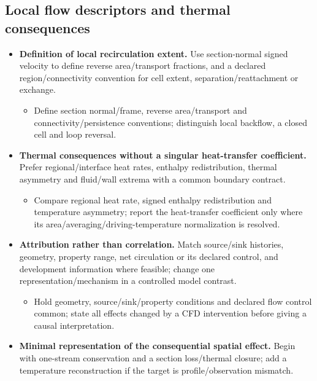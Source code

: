 \subsection{Local flow descriptors and thermal consequences}\label{subsec:local-flow-descriptors-and-thermal-consequences}
\begin{itemize}[leftmargin=*]

\item {}\textbf{Definition of local recirculation extent.} Use section-normal signed velocity to define reverse area/\allowbreak{}transport fractions, and a declared region/\allowbreak{}connectivity convention for cell extent, separation/\allowbreak{}reattachment or exchange.
\begin{itemize}
\item Define section normal/\allowbreak{}frame, reverse area/\allowbreak{}transport and connectivity/\allowbreak{}persistence conventions; distinguish local backflow, a closed cell and loop reversal.
\end{itemize}
\item {}\textbf{Thermal consequences without a singular heat-transfer coefficient.} Prefer regional/\allowbreak{}interface heat rates, enthalpy redistribution, thermal asymmetry and fluid/\allowbreak{}wall extrema with a common boundary contract.
\begin{itemize}
\item Compare regional heat rate, signed enthalpy redistribution and temperature asymmetry; report the heat-transfer coefficient only where its area/\allowbreak{}averaging/\allowbreak{}driving-temperature normalization is resolved.
\end{itemize}
\item {}\textbf{Attribution rather than correlation.} Match source/\allowbreak{}sink histories, geometry, property range, net circulation or its declared control, and development information where feasible; change one representation/\allowbreak{}mechanism in a controlled model contrast.
\begin{itemize}
\item Hold geometry, source/\allowbreak{}sink/\allowbreak{}property conditions and declared flow control common; state all effects changed by a CFD intervention before giving a causal interpretation.
\end{itemize}
\item {}\textbf{Minimal representation of the consequential spatial effect.} Begin with one-stream conservation and a section loss/\allowbreak{}thermal closure; add a temperature reconstruction if the target is profile/\allowbreak{}observation mismatch.

\end{itemize}
